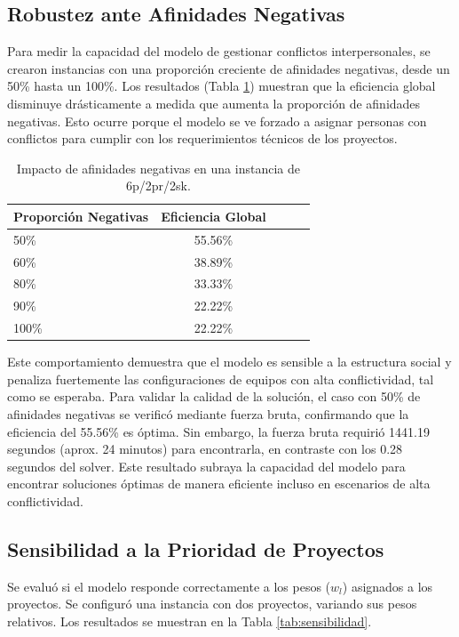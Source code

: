 \documentclass[conference]{IEEEtran}
\begin{document}
\subsection{Robustez ante Afinidades Negativas}
Para medir la capacidad del modelo de gestionar conflictos interpersonales, se crearon instancias con una proporción creciente de afinidades negativas, desde un 50\% hasta un 100\%. Los resultados (Tabla \ref{tab:robustez}) muestran que la eficiencia global disminuye drásticamente a medida que aumenta la proporción de afinidades negativas. Esto ocurre porque el modelo se ve forzado a asignar personas con conflictos para cumplir con los requerimientos técnicos de los proyectos.

\begin{table}[htbp]
    \centering
    \caption{Impacto de afinidades negativas en una instancia de 6p/2pr/2sk.}
    \label{tab:robustez}
    \begin{tabularx}{\linewidth}{@{}lcccc@{}}
        \toprule
        \textbf{Proporción Negativas} & \textbf{Eficiencia Global} \\
        \midrule
        50\%                          & 55.56\%                    \\
        60\%                          & 38.89\%                    \\
        80\%                          & 33.33\%                    \\
        90\%                          & 22.22\%                    \\
        100\%                         & 22.22\%                    \\
        \bottomrule
    \end{tabularx}
\end{table}

Este comportamiento demuestra que el modelo es sensible a la estructura social y penaliza fuertemente las configuraciones de equipos con alta conflictividad, tal como se esperaba. Para validar la calidad de la solución, el caso con 50\% de afinidades negativas se verificó mediante fuerza bruta, confirmando que la eficiencia del 55.56\% es óptima. Sin embargo, la fuerza bruta requirió 1441.19 segundos (aprox. 24 minutos) para encontrarla, en contraste con los 0.28 segundos del solver. Este resultado subraya la capacidad del modelo para encontrar soluciones óptimas de manera eficiente incluso en escenarios de alta conflictividad.

\subsection{Sensibilidad a la Prioridad de Proyectos}
Se evaluó si el modelo responde correctamente a los pesos (\(w_l\)) asignados a los proyectos. Se configuró una instancia con dos proyectos, variando sus pesos relativos. Los resultados se muestran en la Tabla \ref{tab:sensibilidad}.
\end{document}
